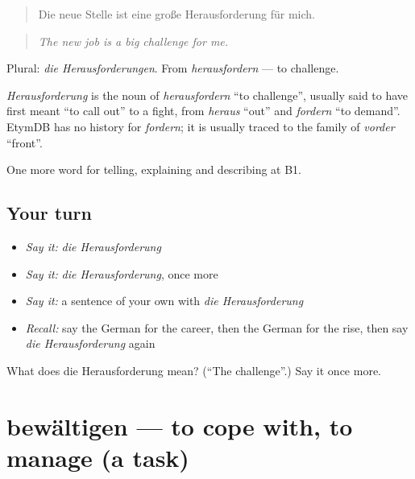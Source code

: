 \begin{quote}
Die neue Stelle ist eine große Herausforderung für mich.
\end{quote}

\begin{quote}
\emph{The new job is a big challenge for me.}
\end{quote}

Plural: \emph{die Herausforderungen}. From \emph{herausfordern} — to challenge.

\begin{cousinweb}
\emph{Herausforderung} is the noun of \emph{herausfordern} \textquotedblleft{}to challenge\textquotedblright{}, usually said to have first meant \textquotedblleft{}to call out\textquotedblright{} to a fight, from \emph{heraus} \textquotedblleft{}out\textquotedblright{} and \emph{fordern} \textquotedblleft{}to demand\textquotedblright{}. EtymDB has no history for \emph{fordern}; it is usually traced to the family of \emph{vorder} \textquotedblleft{}front\textquotedblright{}.
\end{cousinweb}

\begin{grammarlens}[title={What you've built}]
One more word for telling, explaining and describing at B1.
\end{grammarlens}

\subsection*{Your turn}
\begin{itemize}
\raggedright
  \item \emph{Say it:} \emph{die Herausforderung}
  \item \emph{Say it:} \emph{die Herausforderung}, once more
  \item \emph{Say it:} a sentence of your own with \emph{die Herausforderung}
  \item \emph{Recall:} say the German for the career, then the German for the rise, then say \emph{die Herausforderung} again
\end{itemize}

\begin{tcolorbox}[breakable,colback=teal!4,colframe=teal!35!black,title={Before you move on}]
What does die Herausforderung mean? (\textquotedblleft{}The challenge\textquotedblright{}.) Say it once more.
\end{tcolorbox}
\section[bewältigen]{bewältigen — to cope with, to manage (a task)}

